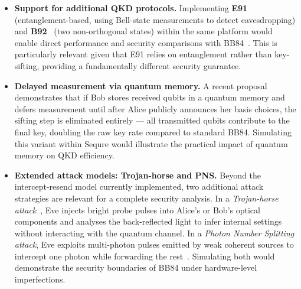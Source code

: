 \documentclass[12pt, a4paper]{article}
\begin{document}
\begin{itemize}
  \item \textbf{Support for additional QKD protocols.}
        Implementing \textbf{E91}~\cite{ekert1991} (entanglement-based,
        using Bell-state measurements to detect eavesdropping) and
        \textbf{B92}~\cite{bennett1992} (two non-orthogonal states) within
        the same platform would enable direct performance and security
        comparisons with BB84~\cite{ieee10872935}. This is particularly
        relevant given that E91 relies on entanglement rather than
        key-sifting, providing a fundamentally different security guarantee.

  \item \textbf{Delayed measurement via quantum memory.}
        A recent proposal~\cite{arxiv2410} demonstrates that if Bob stores
        received qubits in a quantum memory and defers measurement until after
        Alice publicly announces her basis choices, the sifting step is
        eliminated entirely --- all transmitted qubits contribute to the
        final key, doubling the raw key rate compared to standard BB84.
        Simulating this variant within Sequre would illustrate the practical
        impact of quantum memory on QKD efficiency.

  \item \textbf{Extended attack models: Trojan-horse and PNS.}
        Beyond the intercept-resend model currently implemented, two
        additional attack strategies are relevant for a complete security
        analysis. In a \textit{Trojan-horse attack}~\cite{arxiv2502}, Eve
        injects bright probe pulses into Alice's or Bob's optical components
        and analyses the back-reflected light to infer internal settings
        without interacting with the quantum channel. In a
        \textit{Photon Number Splitting attack}, Eve exploits multi-photon
        pulses emitted by weak coherent sources to intercept one photon while
        forwarding the rest~\cite{arxiv2509}. Simulating both would
        demonstrate the security boundaries of BB84 under hardware-level
        imperfections.

\end{itemize}
\end{document}
